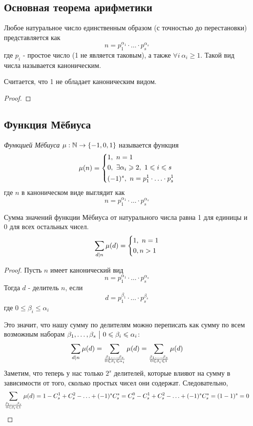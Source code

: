 \subsection{Основная теорема арифметики}

\begin{theorem}
	Любое натуральное число единственным образом (с точностью до перестановки) представляется как
	\[
	n = p_1^{\alpha_1} \cdot \ldots \cdot p_s^{\alpha_s}
	\]
	где $p_i$ - простое число (1 не является таковым), а также $\forall i\ \alpha_i \ge 1$. Такой вид числа называется каноническим.
\end{theorem}

\begin{note}
	Считается, что 1 не обладает каноническим видом.
\end{note}

\begin{proof}
	
\end{proof}

\subsection{Функция Мёбиуса}

\begin{definition}
	\textit{Функцией Мёбиуса} $\mu : \mathbb{N} \rightarrow \{-1, 0, 1\}$ называется функция
	\[
		\mu(n) = \left\{\begin{aligned}
			&{1,\ n = 1}
			\\
			&{0,\ \exists \alpha_i \geqslant 2,\ 1 \leqslant i \leqslant s}
			\\
			&{(-1)^s,\ n = p_1^1 \cdot \ldots \cdot p_s^1}
		\end{aligned}\right.
	\]
	где $n$ в каноническом виде выглядит как
	\[
		n = p_1^{\alpha_1} \cdot \ldots \cdot p_s^{\alpha_s}
	\]
\end{definition}

\begin{lemma}
	Сумма значений функции Мёбиуса от натурального числа равна 1 для единицы и 0 для всех остальных чисел.
	\[
		\sum\limits_{d \mid n} \mu(d) = \left\{\begin{aligned}
			&{1,\ n = 1}
			\\
			&{0, n > 1}
		\end{aligned}\right.
	\]
\end{lemma}

\begin{proof}
	Пусть $n$ имеет канонический вид
	\[
		n = p_1^{\alpha_1} \cdot \ldots \cdot p_s^{\alpha_s}
	\]
	Тогда $d$ - делитель $n$, если
	\[
		d = p_1^{\beta_1} \cdot \ldots \cdot p_s^{\beta_s}
	\]
	где $0 \le \beta_i \le \alpha_i$
	
	Это значит, что нашу сумму по делителям можно переписать как сумму по всем возможным наборам $\beta_1, \ldots, \beta_s \ \big|\  0 \leqslant \beta_i \leqslant \alpha_i$:
	\[
		\sum\limits_{d \mid n} \mu(d) = \sum\limits_{\beta_1, \ldots, \beta_s \over 0 \leqslant \beta_i \leqslant \alpha_i} \mu(d) = \sum\limits_{\beta_1, \ldots, \beta_s \over 0 \leqslant \beta_i \leqslant 1} \mu(d)
	\]
	Заметим, что теперь у нас только $2^s$ делителей, которые влияют на сумму в зависимости от того, сколько простых чисел они содержат. Следовательно,
	\[
		\sum\limits_{\beta_1, \ldots, \beta_s \over 0 \leqslant \beta_i \leqslant 1} \mu(d) = 1 - C_s^1 + C_s^2 - \ldots + (-1)^s C_s^s = \\
		C_s^0 - C_s^1 + C_s^2 - \ldots + (-1)^s C_s^s = (1 - 1)^s = 0
	\]
\end{proof}

